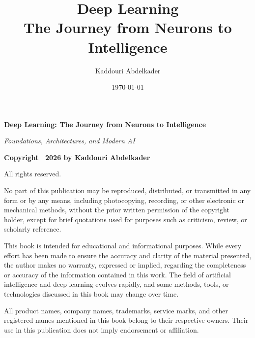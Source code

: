 \documentclass[11pt,a4paper,oneside]{book}
\title{Deep Learning \\[0.55em] {\fontsize{18}{23}\selectfont The Journey from Neurons to Intelligence}}
\author{Kaddouri Abdelkader}
\date{\today}
\begin{document}
\frontmatter
\maketitle

\thispagestyle{empty}

\vspace*{\fill}

\begin{center}
    {\Large\textbf{Deep Learning: The Journey from Neurons to Intelligence}}
    
    \vspace{0.5cm}
    
    {\large\textit{Foundations, Architectures, and Modern AI}}
    
    \vspace{1.5cm}
    
    {\large\textbf{Copyright \textcopyright\ 2026 by Kaddouri Abdelkader}}
    
    \vspace{0.8cm}
    
    All rights reserved.
\end{center}

\vspace{1cm}

\noindent
No part of this publication may be reproduced, distributed, or transmitted
in any form or by any means, including photocopying, recording, or other
electronic or mechanical methods, without the prior written permission of
the copyright holder, except for brief quotations used for purposes such
as criticism, review, or scholarly reference.

\vspace{0.5cm}

\noindent
This book is intended for educational and informational purposes. While
every effort has been made to ensure the accuracy and clarity of the
material presented, the author makes no warranty, expressed or implied,
regarding the completeness or accuracy of the information contained in
this work. The field of artificial intelligence and deep learning evolves
rapidly, and some methods, tools, or technologies discussed in this book
may change over time.

\vspace{0.5cm}

\noindent
All product names, company names, trademarks, service marks, and other
registered names mentioned in this book belong to their respective owners.
Their use in this publication does not imply endorsement or affiliation.
\end{document}
